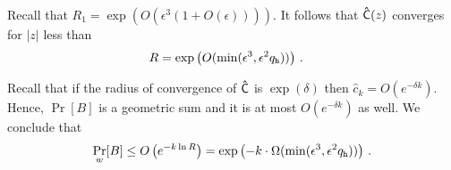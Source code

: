   Recall that $R_1 = \exp\left(O(\epsilon^3 (1 + O(\epsilon)))\right)$. 
  It follows that $\mathsf{\hat{C}}(z)$ converges for 
  $|z|$ less than 
  \begin{align}\label{eq:RoC-unique-honest}
    R &= \exp\left(O(\min(\epsilon^3, \epsilon^2 q_{\mathtt{h}}))\right)
    \,.
  \end{align}

  Recall that if the radius of convergence of
  $\mathsf{\hat{C}}$ is $\exp(\delta)$ then 
  $\hat{c}_k = O(e^{-\delta k})$. 
  Hence, $\Pr[B]$ is a geometric sum and it is 
  at most $O(e^{-\delta k})$ as well. 
  We conclude that 
  $$
    \Pr_w[B] 
      \leq O\left(e^{-k \ln R }\right)
      = \exp\left(-k\cdot \Omega(\min(\epsilon^3, \epsilon^2 q_{\mathtt{h}}))\right)
      \,.
  $$


